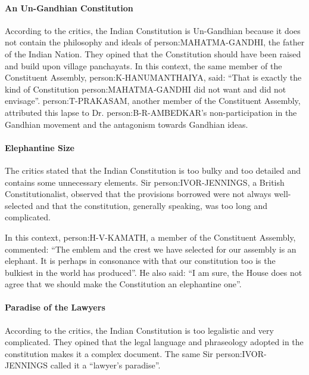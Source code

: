\begin{multicols}{2}
\paragraph{An Un-Gandhian Constitution}
According to the critics, the Indian Constitution is Un-Gandhian because it does not contain the philosophy and ideals of \gls{person:MAHATMA-GANDHI}, the father of the Indian Nation. They opined that the Constitution should have been raised and build upon village panchayats. In this context, the same member of the Constituent Assembly, \gls{person:K-HANUMANTHAIYA}, said: ``That is exactly the kind of Constitution \gls{person:MAHATMA-GANDHI} did not want and did not envisage''. \gls{person:T-PRAKASAM}, another member of the Constituent Assembly, attributed this lapse to Dr. \gls{person:B-R-AMBEDKAR}'s non-participation in the Gandhian movement and the antagonism towards Gandhian ideas.

\paragraph{Elephantine Size}
The critics stated that the Indian Constitution is too bulky and too detailed and contains some unnecessary elements. Sir \gls{person:IVOR-JENNINGS}, a British Constitutionalist, observed that the provisions borrowed were not always well-selected and that the constitution, generally speaking, was too long and complicated.

In this context, \gls{person:H-V-KAMATH}, a member of the Constituent Assembly, commented: ``The emblem and the crest we have selected for our assembly is an elephant. It is perhaps in consonance with that our constitution too is the bulkiest in the world has produced''. He also said: ``I am sure, the House does not agree that we should make the Constitution an elephantine one''.

\paragraph{Paradise of the Lawyers}
According to the critics, the Indian Constitution is too legalistic and very complicated. They opined that the legal language and phraseology adopted in the constitution makes it a complex document. The same Sir \gls{person:IVOR-JENNINGS} called it a ``lawyer's paradise''.


\end{multicols}
